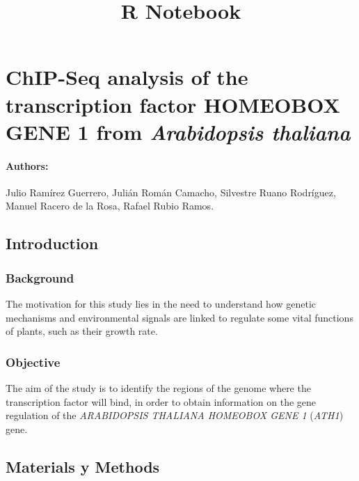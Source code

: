 \documentclass[
]{article}
\title{R Notebook}
\author{}
\date{\vspace{-2.5em}}
\begin{document}
\maketitle

\hypertarget{chip-seq-analysis-of-the-transcription-factor-homeobox-gene-1-from-arabidopsis-thaliana}{%
\section{\texorpdfstring{ChIP-Seq analysis of the transcription factor
HOMEOBOX GENE 1 from \emph{Arabidopsis
thaliana}}{ChIP-Seq analysis of the transcription factor HOMEOBOX GENE 1 from Arabidopsis thaliana}}\label{chip-seq-analysis-of-the-transcription-factor-homeobox-gene-1-from-arabidopsis-thaliana}}

\hypertarget{authors}{%
\paragraph{Authors:}\label{authors}}

Julio Ramírez Guerrero, Julián Román Camacho, Silvestre Ruano Rodríguez,
Manuel Racero de la Rosa, Rafael Rubio Ramos.

\hypertarget{introduction}{%
\subsection{Introduction}\label{introduction}}

\hypertarget{background}{%
\subsubsection{Background}\label{background}}

The motivation for this study lies in the need to understand how genetic
mechanisms and environmental signals are linked to regulate some vital
functions of plants, such as their growth rate.

\hypertarget{objective}{%
\subsubsection{Objective}\label{objective}}

The aim of the study is to identify the regions of the genome where the
transcription factor will bind, in order to obtain information on the
gene regulation of the \emph{ARABIDOPSIS THALIANA HOMEOBOX GENE 1}
(\emph{ATH1}) gene.

\hypertarget{materials-y-methods}{%
\subsection{Materials y Methods}\label{materials-y-methods}}
\end{document}

